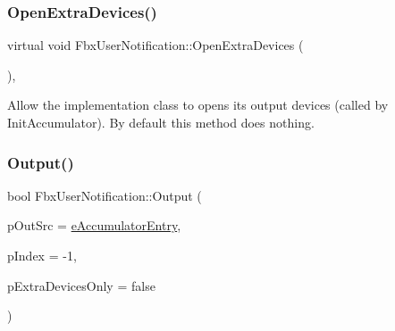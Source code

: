 \subsubsection{\texorpdfstring{Open\+Extra\+Devices()}{OpenExtraDevices()}}
{\footnotesize\ttfamily virtual void Fbx\+User\+Notification\+::\+Open\+Extra\+Devices (\begin{DoxyParamCaption}{ }\end{DoxyParamCaption})\hspace{0.3cm}{\ttfamily [protected]}, {\ttfamily [virtual]}}

Allow the implementation class to opens its output devices (called by Init\+Accumulator). By default this method does nothing. \mbox{\label{class_fbx_user_notification_a0bcf59aa5f9923410bc150a73b088017}} 
\subsubsection{\texorpdfstring{Output()}{Output()}\hspace{0.1cm}{\footnotesize\ttfamily [1/3]}}
{\footnotesize\ttfamily bool Fbx\+User\+Notification\+::\+Output (\begin{DoxyParamCaption}\item[{\hyperlink{class_fbx_user_notification_a45290aa788e47fce1d7b8a88687aa184}{E\+Output\+Source}}]{p\+Out\+Src = {\ttfamily \hyperlink{class_fbx_user_notification_a45290aa788e47fce1d7b8a88687aa184a04843bd5dec0b90ac08d75d8f33309af}{e\+Accumulator\+Entry}},  }\item[{int}]{p\+Index = {\ttfamily -\/1},  }\item[{bool}]{p\+Extra\+Devices\+Only = {\ttfamily false} }\end{DoxyParamCaption})}

